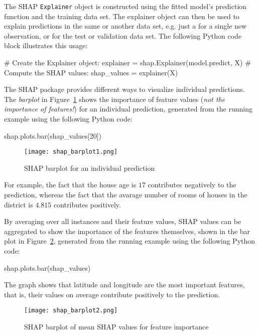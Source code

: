 The SHAP \texttt{Explainer} object is constructed using the fitted model's prediction function and the training data set. The explainer object can then be used to explain predictions in the same or another data set, e.g. just a for a single new observation, or for the test or validation data set. The following Python code block illustrates this usage:

\begin{pythoncode}
# Create the Explainer object:
explainer = shap.Explainer(model.predict, X)
# Compute the SHAP values:
shap_values = explainer(X)
\end{pythoncode}


The SHAP package provides different ways to visualize individual predictions. The \emph{barplot} in Figure~\ref{fig:shapbar1} shows the importance of feature values (\emph{not the importance of features!}) for an individual prediction, generated from the running example using the following Python code:

\begin{pythoncode}
shap.plots.bar(shap_values[20])
\end{pythoncode}

\begin{figure}
\centering

\texttt{[image: shap\_barplot1.png]}
\caption{SHAP barplot for an individual prediction}
\label{fig:shapbar1}
\end{figure}

For example, the fact that the house age is $17$ contributes negatively to the prediction, whereas the fact that the avarage number of rooms of houses in the district is $4.815$ contributes positively.

By averaging over all instances and their feature values, SHAP values can be aggregated to show the importance of the features themselves, shown in the bar plot in Figure~\ref{fig:shapbar2}, generated from the running example using the following Python code:

\begin{pythoncode}
shap.plots.bar(shap_values)
\end{pythoncode}

The graph shows that latitude and longitude are the most important features, that is, their values on average contribute positively to the prediction. 

\begin{figure}
\centering

\texttt{[image: shap\_barplot2.png]}
\caption{SHAP barplot of mean SHAP values for feature importance}
\label{fig:shapbar2}
\end{figure}


